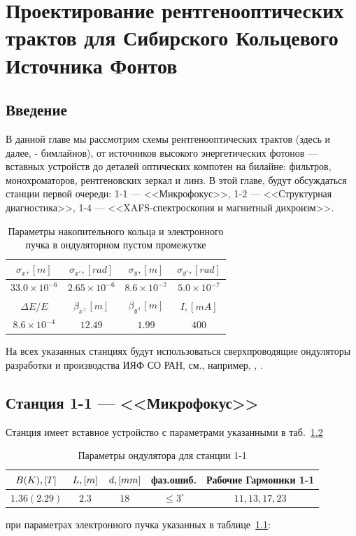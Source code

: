 \chapter{Проектирование рентгенооптических трактов для Сибирского Кольцевого Источника Фонтов}

\section{Введение}
В данной главе мы рассмотрим схемы рентгенооптических трактов (здесь и далее, - бимлайнов), от источников высокого энергетических фотонов --- вставных устройств до деталей оптических компотен на билайне: фильтров, монохроматоров, рентгеновских зеркал и линз. В этой главе, будут обсуждаться станции первой очереди: 1-1 --- <<Микрофокус>>, 1-2 --- <<Структурная диагностика>>, 1-4 --- <<XAFS-спектроскопия и магнитный дихроизм>>.  
\begin{table}[h!]
	\centering
	\begin{tabular}{c|c|c|c}
		\hline\hline
		\rule{0pt}{3ex}   $\sigma_x, [m]$ & $\sigma_{x'}, [rad]$ & $\sigma_y, [m]$     & $\sigma_{y'}, [rad]$ \\ \hline
		\rule{0pt}{3ex}   $33.0 \times 10^{-6}$  & $2.65 \times 10^{-6}$  &  $8.6 \times 10^{-7}$ & $5.0 \times 10^{-7}$   \\
		\hline	\hline
		\rule{0pt}{3ex}   $\Delta E / E$ & $\beta_x,[m]$ & $\beta_y,[m]$   & $I,[mA]$\\ \hline
		\rule{0pt}{3ex}	 $8.6 \times 10^{-4}$ & $12.49$ & $1.99$ & $400$ \\ \hline\hline
	\end{tabular}
	\vspace{4pt} 
	\caption{Параметры накопительного кольца и электронного пучка в ондуляторном пустом промежутке}
	\label{table:ebeam}
\end{table}
На всех указанных станциях будут использоваться сверхпроводящие ондуляторы разработки и производства ИЯФ СО РАН, см., например,  \cite{bragin2018short}, \cite{gluskin2019superconducting}.

\section{Станция 1-1 --- <<Микрофокус>>}
Станция имеет вставное устройство с параметрами указанными в таб.~\ref{table:und1-1}
\begin{table}[h!]
	\centering
	\begin{tabular}{c|c|c|c|c}
		\hline\hline
		\rule{0pt}{3ex}$\mathnormal{B(K), [T]}$   & $\mathnormal{L, [m]}$ & $\mathnormal{d, [mm]}$ & фаз.ошиб.                & Рабочие Гармоники 1-1       \\ \hline
		\rule{0pt}{3ex}$1.36(2.29)$  & $2.3$    & $18$      & $\leq 3^{\circ}$& $11, 13, 17, 23$\\
		\hline\hline
	\end{tabular}
	\vspace{4pt} 
	\caption{Параметры ондулятора для станции 1-1}
	\label{table:und1-1}
\end{table}
при параметрах электронного пучка указанных в таблице~\ref{table:ebeam}: 


